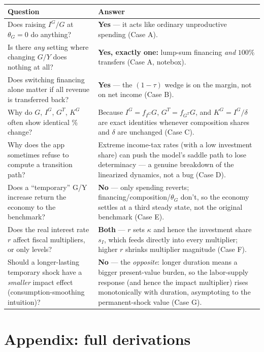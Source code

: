 \documentclass[11pt]{article}
\begin{document}
\begin{center}
\begin{tabular}{p{}p{}}
\toprule
Question & Answer \\
\midrule
Does raising $I^G/G$ at $\theta_G=0$ do anything? &
\textbf{Yes} --- it acts like ordinary unproductive spending (Case A). \\[4pt]
Is there \emph{any} setting where changing $G/Y$ does nothing at all? &
\textbf{Yes, exactly one:} lump-sum financing \emph{and} $100\%$ transfers
(Case A, notebox). \\[4pt]
Does switching financing alone matter if all revenue is transferred back? &
\textbf{Yes} --- the $(1-\tau)$ wedge is on the margin, not on net income
(Case B). \\[4pt]
Why do $G$, $I^G$, $G^T$, $K^G$ often show identical \% change? &
Because $I^G=f_{I^G}G$, $G^T=f_{G^T}G$, and $K^G=I^G/\delta$ are exact
identities whenever composition shares and $\delta$ are unchanged (Case C). \\[4pt]
Why does the app sometimes refuse to compute a transition path? &
Extreme income-tax rates (with a low investment share) can push the
model's saddle path to lose determinacy --- a genuine breakdown of the
linearized dynamics, not a bug (Case D). \\[4pt]
Does a ``temporary'' G/Y increase return the economy to the benchmark? &
\textbf{No} --- only spending reverts; financing/composition/$\theta_G$
don't, so the economy settles at a third steady state, not the original
benchmark (Case E). \\[4pt]
Does the real interest rate $r$ affect fiscal multipliers, or only levels? &
\textbf{Both} --- $r$ sets $\kappa$ and hence the investment share $s_I$,
which feeds directly into every multiplier; higher $r$ shrinks multiplier
magnitude (Case F). \\[4pt]
Should a longer-lasting temporary shock have a \emph{smaller} impact
effect (consumption-smoothing intuition)? &
\textbf{No} --- the \emph{opposite}: longer duration means a bigger
present-value burden, so the labor-supply response (and hence the
impact multiplier) rises monotonically with duration, asymptoting to
the permanent-shock value (Case G). \\
\bottomrule
\end{tabular}
\end{center}

\appendix
\part{Appendix: full derivations}
\end{document}
